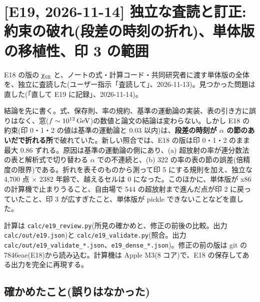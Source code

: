 \section{[E19, 2026-11-14] 独立な査読と訂正: 約束の破れ(段差の時刻の折れ)、単体版の移植性、印 3 の範囲}\label{sec:e19}

E18 の版の χ$_\mathrm{SR}$ と、ノートの式・計算コード・共同研究者に渡す単体版の全体を、独立に査読した(ユーザー指示「査読して」、2026-11-13)。見つかった問題は直した(「直して E19 に記録」、2026-11-14)。

結論を先に書く。式、保存則、率の規約、基準の運動論の実装、表の引き方に誤りはなく、窓($f\sim10^{12}\,\mathrm{GeV}$)の数値と論文の結論は変わらない。しかし E18 の約束(印 0・1・2 の値は基準の運動論と 0.03 以内)は、\textbf{段差の時刻が $\alpha$ の節のあいだで折れる所}で破れていた。新しい照合では、E18 の版は印 0・1・2 のまま最大 0.86 ずれる。原因は基準の運動論の側にあり、(a) 超放射の率が連分数法の表と解析式で切り替わる $\alpha$ での不連続と、(b) 322 の率の表の節の誤差(倍精度の限界)である。折れを表そのものから測って印 5 にする規則を加え、独立な 4{,}700 点 × 2382 年齢で、越えるセルは 0 になった。このほかに、単体版が x86 の計算機で止まりうること、自由場で 544 の超放射まで進んだ点が印 2 に戻っていたこと、印 3 が広すぎたこと、単体版が pickle できないことなどを直した。

計算は \texttt{calc/e19\_review.py}(所見の確かめと、修正の前後の比較。出力 \texttt{calc/out/e19.json})と \texttt{calc/e19\_validate.py}(照合。出力 \texttt{calc/out/e19\_validate\_*.json}、\texttt{e19\_dense\_*.json})。修正の前の版は git の 7846eae(E18)から読み込む。計算機は Apple M3(8 コア)で、E18 の保存してある出力を完全に再現する。

\subsection{確かめたこと(誤りはなかった)}

